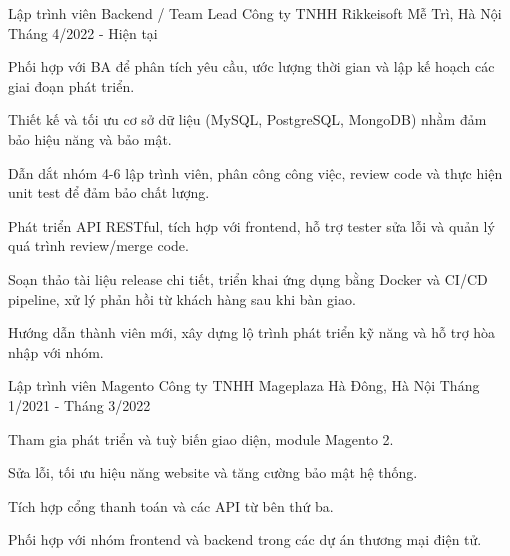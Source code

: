 

\begin{cventries}

  \cventry
    {Lập trình viên Backend / Team Lead} %
    {Công ty TNHH Rikkeisoft} %
    {Mễ Trì, Hà Nội} %
    {Tháng 4/2022 - Hiện tại} %
    {
      \begin{cvitems} %
        \item {Phối hợp với BA để phân tích yêu cầu, ước lượng thời gian và lập kế hoạch các giai đoạn phát triển.}
        \item {Thiết kế và tối ưu cơ sở dữ liệu (MySQL, PostgreSQL, MongoDB) nhằm đảm bảo hiệu năng và bảo mật.}
        \item {Dẫn dắt nhóm 4-6 lập trình viên, phân công công việc, review code và thực hiện unit test để đảm bảo chất lượng.}
        \item {Phát triển API RESTful, tích hợp với frontend, hỗ trợ tester sửa lỗi và quản lý quá trình review/merge code.}
        \item {Soạn thảo tài liệu release chi tiết, triển khai ứng dụng bằng Docker và CI/CD pipeline, xử lý phản hồi từ khách hàng sau khi bàn giao.}
        \item {Hướng dẫn thành viên mới, xây dựng lộ trình phát triển kỹ năng và hỗ trợ hòa nhập với nhóm.}
      \end{cvitems}
    }

  \cventry
    {Lập trình viên Magento} %
    {Công ty TNHH Mageplaza} %
    {Hà Đông, Hà Nội} %
    {Tháng 1/2021 - Tháng 3/2022} %
    {
      \begin{cvitems} %
        \item {Tham gia phát triển và tuỳ biến giao diện, module Magento 2.}
        \item {Sửa lỗi, tối ưu hiệu năng website và tăng cường bảo mật hệ thống.}
        \item {Tích hợp cổng thanh toán và các API từ bên thứ ba.}
        \item {Phối hợp với nhóm frontend và backend trong các dự án thương mại điện tử.}
      \end{cvitems}
    }

\end{cventries}
